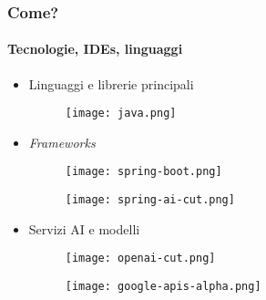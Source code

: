 \begin{frame}[t,fragile] \frametitle{Come?}
\framesubtitle{Tecnologie, IDEs, linguaggi}
\begin{itemize}[leftmargin=10pt,align=right]
    \setlength\itemsep{.7em}
    \item[\alert{\faArrowCircleRight}] Linguaggi e librerie principali
    \begin{minipage}[t]{\textwidth}
        \begin{minipage}[t]{.2\textwidth}
            \begin{figure}[ht]
                \texttt{[image: java.png]}
            \end{figure}
        \end{minipage}
    \end{minipage}
    \item[\alert{\faArrowCircleRight}] \emph{Frameworks}
    \begin{minipage}[t]{\textwidth}
        \begin{minipage}[t]{.2\textwidth}
            \begin{figure}[ht]
                \texttt{[image: spring-boot.png]}
            \end{figure}
        \end{minipage}
        \begin{minipage}[t]{.2\textwidth}
            \begin{figure}[ht]
                \texttt{[image: spring-ai-cut.png]}
            \end{figure}
        \end{minipage}
    \end{minipage}
    \item[\alert{\faArrowCircleRight}] Servizi AI e modelli
    \begin{minipage}[t]{\textwidth}
        \begin{minipage}[t]{.2\textwidth}
            \begin{figure}[ht]
                \texttt{[image: openai-cut.png]}
            \end{figure}
        \end{minipage}
        \begin{minipage}[t]{.2\textwidth}
            \begin{figure}[ht]
                \texttt{[image: google-apis-alpha.png]}

\end{figure}
\end{minipage}
\end{minipage}
\end{itemize}
\end{frame}
